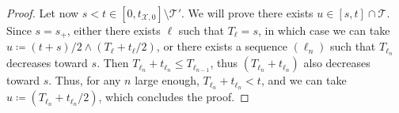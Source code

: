 \documentclass[11pt]{article}
\begin{document}
\begin{proof}
  Let now  $s<t\in [0,t_{\mathcal{X},0}] \setminus \mathcal{T}'$. We will prove there exists $u\in [s,t]\cap \mathcal{T}$.
  Since $s=s_+$, either there exists $\ell$ such that $T_\ell=s$, in which case we can take $u\coloneqq (t+s)/2 \wedge (T_\ell+t_\ell/2)$, or there exists a sequence $(\ell_n)$ such that $T_{\ell_n}$ decreases toward $s$. Then $T_{\ell_n}+t_{\ell_n}\leq T_{\ell_{n-1}}$, thus $(T_{\ell_n}+t_{\ell_n} )$ also decreases toward $s$. Thus, for any $n$ large enough, $T_{\ell_n}+t_{\ell_n} <t$, and we can take $u\coloneqq (T_{\ell_n}+t_{\ell_n}/2)$, which concludes the proof.

\end{proof}
\end{document}
